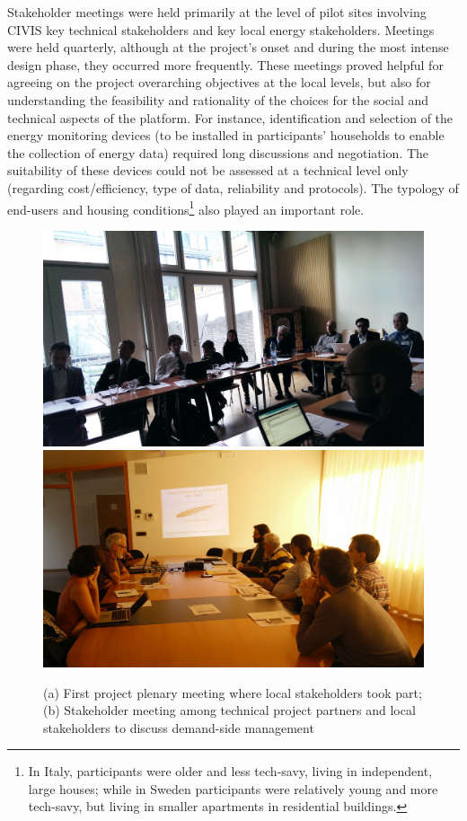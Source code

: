 
Stakeholder meetings were held primarily at the level of pilot sites involving CIVIS key technical stakeholders and
key local energy stakeholders. Meetings were held quarterly, although at the project's onset and during
the most intense design phase, they occurred more frequently.
% 
These meetings proved helpful for agreeing on the project overarching objectives at the local levels, but also
for understanding the feasibility and rationality of the choices for the social and technical aspects of the platform.
For instance, identification and selection of the energy monitoring devices (to be installed in
participants' households to enable the collection of energy data) required long discussions and negotiation. 
The suitability of these devices could not be assessed at a technical level only (regarding cost/efficiency, type of data,
reliability and protocols).
The typology of end-users and housing conditions\footnote{In Italy, participants were older and less tech-savy, living in independent, large houses; while in Sweden participants were relatively young and more tech-savy, but living in smaller apartments in residential buildings.}
also played an important role. 

%
\begin{figure}[b]
      \sidecaption[b]
        \includegraphics[width=.32\linewidth]{img/Stkh_plenary1.jpg}
	        \includegraphics[width=.32\linewidth]{img/Stkh_meeting_tou_crop.jpg} 
    \caption{(a) First project plenary meeting where local stakeholders took part; (b) Stakeholder meeting among technical project partners and
    local stakeholders to discuss demand-side management
}
\label{fig:stkh_meetings}
\end{figure}
%

